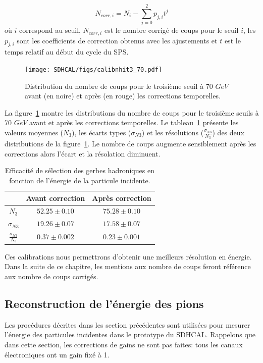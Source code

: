 \begin{equation}
  N_{corr,i}=N_i-\sum_{j=0}^{2}p_{j,i}t^j
\end{equation}
où $i$ correspond au seuil, $N_{corr,i}$ est le nombre corrigé de coups pour le seuil $i$, les $p_{j,i}$ sont les coefficients de correction obtenus avec les ajustements et $t$ est le temps relatif au début du cycle du SPS.
\begin{figure}[!ht]
  \begin{center}
    \texttt{[image: SDHCAL/figs/calibnhit3\_70.pdf]}
    \caption{Distribution du nombre de coups pour le troisième seuil à 70 $GeV$ avant (en noire) et après (en rouge) les corrections temporelles.}
    \label{fig:nhit3_corrected}
  \end{center}
\end{figure}
La figure~\ref{fig:nhit3_corrected} montre les distributions du nombre de coups pour le troisième seuils à 70 $GeV$ avant et après les corrections temporelles. Le tableau~\ref{tab.n3_comp} présente les valeurs moyennes ($\bar N_3$), les écarts types ($\sigma_{N3}$) et les résolutions ($\frac{\sigma_{N3}}{N_3}$) des deux distributions de la figure~\ref{fig:nhit3_corrected}. Le nombre de coups augmente sensiblement après les corrections alors l'écart et la résolation diminuent. 
\begin{table}[!ht]
  \begin{center}
    \begin{tabular}{c|c|c}
      $ $ & Avant correction & Après correction \\
      \hline
      $N_3$ & $52.25 \pm 0.10$ & $75.28 \pm 0.10$\\
      $\sigma_{N3}$ & $19.26 \pm 0.07$ & $17.58 \pm 0.07$\\
      $\frac{\sigma_{N3}}{N_3}$ & $0.37 \pm 0.002$& $0.23 \pm 0.001$\\
    \end{tabular}
  \end{center}  
  \caption{Efficacité de sélection des gerbes hadroniques en fonction de l'énergie de la particule incidente.}
  \label{tab.n3_comp}
\end{table}
Ces calibrations nous permettrons d'obtenir une meilleurs résolution en énergie. Dans la suite de ce chapitre, les mentions aux nombre de coups feront référence aux nombre de coups corrigés.

\subsection{Reconstruction de l'énergie des pions}
Les procédures décrites dans les section précédentes sont utilisées pour mesurer l’énergie des particules incidentes dans le prototype du SDHCAL. Rappelons que dans cette section, les corrections de gains ne sont pas faites: tous les canaux électroniques ont un gain fixé à 1. 
